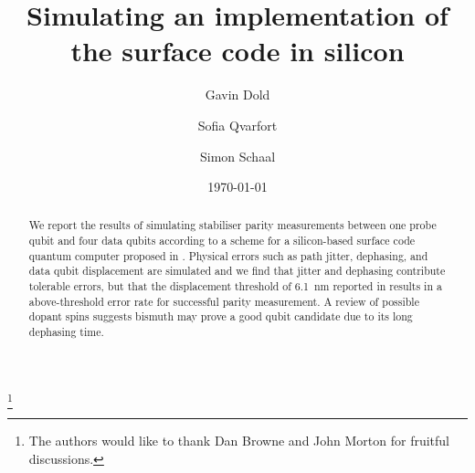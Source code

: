 \documentclass[%
twocolumn,
nofootinbib,
 amsmath,amssymb,
 aps,
]{revtex4-1}
\begin{document}

\title{Simulating an implementation of the surface code in silicon }%
\let\thefootnote\relax\footnote{The authors would like to thank Dan Browne and John Morton for fruitful discussions. } %

\author{Gavin Dold}
\author{Sofia Qvarfort}
 
\author{Simon Schaal}



\date{\today}%

\begin{abstract}
	We report the results of simulating stabiliser parity measurements between one probe qubit and four data qubits according to a scheme for a silicon-based surface code quantum computer proposed in \cite{OGorman2016}. Physical errors such as path jitter, dephasing, and data qubit displacement are simulated and we find that jitter and dephasing contribute tolerable errors, but that the displacement threshold of \SI{6.1}{\nano\metre} reported in \cite{OGorman2016} results in a above-threshold error rate for successful parity measurement. A review of possible dopant spins suggests bismuth may prove a good qubit candidate due to its long dephasing time.
\end{abstract}

\maketitle
\tableofcontents







 











{}
\end{document}
